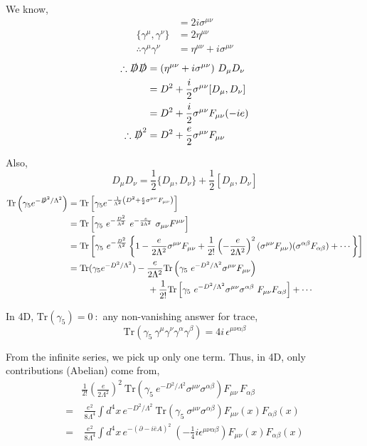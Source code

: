\documentclass[14pt]{article} %
\begin{document}
We know,
\begin{align*}
[\gamma^\mu , \gamma^\nu] &= 2i  \sigma^{\mu \nu}
\\
\{\gamma^\mu , \gamma^\nu\} &= 2\eta^{\mu \nu}
\\
\therefore \gamma^\mu \gamma^\nu &= \eta^{\mu \nu} + i  \sigma^{\mu \nu}
\end{align*}
\begin{align*}
\therefore \slashed{D} \slashed{D} &= (\eta^{\mu\nu} + i\sigma^{\mu\nu})\ D_\mu D_\nu 
\\
&= D^2 + \frac{i}{2}\sigma^{\mu\nu}[D_\mu,D_\nu]
\\
&= D^2 + \frac{i}{2}\sigma^{\mu\nu}F_{\mu\nu}(-ie)
\\
\therefore \slashed{D}^2 &= D^2 + \frac{e}{2}\sigma^{\mu\nu}F_{\mu\nu}
\end{align*}

Also,
\[
D_\mu D_\nu
=
\frac{1}{2}\{D_\mu,D_\nu\}
+
\frac{1}{2}[D_\mu,D_\nu]
\]
\begin{align*}
\text{Tr}\left(
\gamma_5
e^{-\slashed{D}^2/\Lambda^2}
\right)
&= \text{Tr} \left[
\gamma_5
e^{ -\frac{1}{\Lambda^2} \left(D^2 + \frac{e}{2}\sigma^{\mu\nu}F_{\mu\nu} \right) }
\right]
\\
&= \text{Tr} \left[ \gamma_5 \ e^{-\frac{D^2}{\Lambda^2}} \ e^{-\frac{e}{2 \Lambda^2}} \ \sigma_{\mu \nu} F^{\mu \nu} \right]
\\
&= \text{Tr} \left[ \gamma_5 \ e^{-\frac{D^2}{\Lambda^2}} 
\left\{
1
-
\frac{e}{2\Lambda^2}\sigma^{\mu\nu}F_{\mu\nu}
+
\frac{1}{2!}
\left(
-\frac{e}{2\Lambda^2}
\right)^2
(\sigma^{\mu\nu}F_{\mu\nu})
(\sigma^{\alpha\beta}F_{\alpha\beta})
+ \cdots
\right\}
\right]
\\
&= \mathrm{Tr}(\gamma_5 e^{-D^2/\Lambda^2})
-
\frac{e}{2\Lambda^2}
\mathrm{Tr}
\left(
\gamma_5 \ e^{-D^2/\Lambda^2} 
\sigma^{\mu\nu}F_{\mu\nu}
\right)
\\
& \qquad \qquad \qquad \qquad \quad +
\frac{1}{2!}
\mathrm{Tr}
\left[
\gamma_5 \
e^{-D^2/\Lambda^2}
\sigma^{\mu\nu} \sigma^{\alpha\beta} \
F_{\mu\nu}F_{\alpha\beta}
\right]
+ \cdots
\end{align*}

In 4D, \(\mathrm{Tr}(\gamma_5) = 0 ~:\) any non-vanishing answer for trace,
\[
\text{Tr}(\gamma_5\ \gamma^\mu\gamma^\nu\gamma^\alpha\gamma^\beta)
=
4i\,\epsilon^{\mu\nu\alpha\beta}
\]

From the infinite series, we pick up only one term. Thus, in 4D, only contributions (Abelian) come from,
\begin{align*}
&\frac{1}{2!}
\left(\frac{e}{2\Lambda^2}\right)^2 \
\mathrm{Tr}
\left(
\gamma_5 \
e^{-D^2/\Lambda^2}
\sigma^{\mu\nu}\sigma^{\alpha\beta}
\right)
F_{\mu\nu}\, F_{\alpha\beta}
\\
=
&\ \frac{e^2}{8\Lambda^4}
\int d^4x \,
e^{-D^2/\Lambda^2}
\ \text{Tr}
\left(
\gamma_5 \
\sigma^{\mu\nu}\sigma^{\alpha\beta}
\right)
F_{\mu\nu}(x)F_{\alpha\beta}(x)
\\
=
&\ \frac{e^2}{8\Lambda^4}
\int d^4x \,
e^{-{(\partial - i \bar e A )}^2}
\
\left(
-\frac{1}{4} i \epsilon^{\mu \nu \alpha\beta}
\right)
F_{\mu\nu}(x)F_{\alpha\beta}(x)
\end{align*}
\end{document}
